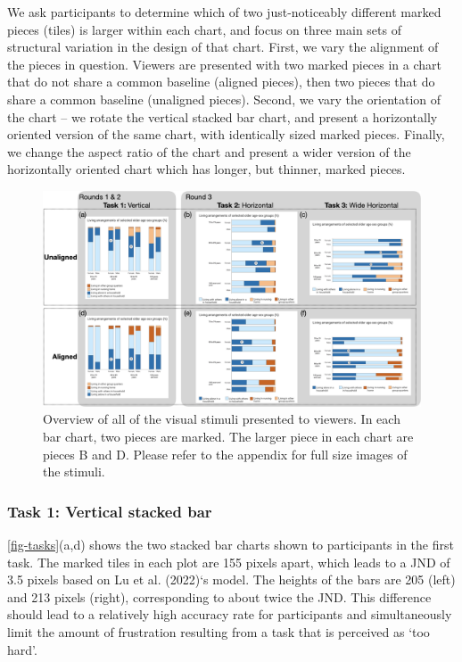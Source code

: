 \documentclass[
]{jds}
\begin{document}
We ask participants to determine which of two just-noticeably different
marked pieces (tiles) is larger within each chart, and focus on three
main sets of structural variation in the design of that chart. First, we
vary the alignment of the pieces in question. Viewers are presented with
two marked pieces in a chart that do not share a common baseline
(aligned pieces), then two pieces that do share a common baseline
(unaligned pieces). Second, we vary the orientation of the chart -- we
rotate the vertical stacked bar chart, and present a horizontally
oriented version of the same chart, with identically sized marked
pieces. Finally, we change the aspect ratio of the chart and present a
wider version of the horizontally oriented chart which has longer, but
thinner, marked pieces.

\begin{figure}[hbt]

{\centering \includegraphics[width=1\textwidth,height=\textheight]{images/stimuli-overview-1.png}

}

\caption{\label{fig-tasks}Overview of all of the visual stimuli
presented to viewers. In each bar chart, two pieces are marked. The
larger piece in each chart are pieces B and D. Please refer to the
appendix for full size images of the stimuli.}

\end{figure}

\hypertarget{task-1-vertical-stacked-bar}{%
\subsubsection{Task 1: Vertical stacked
bar}\label{task-1-vertical-stacked-bar}}

\autoref{fig-tasks}(a,d) shows the two stacked bar charts shown to
participants in the first task. The marked tiles in each plot are 155
pixels apart, which leads to a JND of 3.5 pixels based on Lu et al.
(2022)`s model. The heights of the bars are 205 (left) and 213 pixels
(right), corresponding to about twice the JND. This difference should
lead to a relatively high accuracy rate for participants and
simultaneously limit the amount of frustration resulting from a task
that is perceived as `too hard'.
\end{document}
